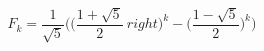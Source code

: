 \documentclass[preview]{standalone}
\begin{document}
\begin{center}
$$F_k = \frac{1}{\sqrt{5}} \big( \big(\frac{1 + \sqrt{5}}{2} \  right)^k - \big(\frac{1 - \sqrt{5}}{2})^k \big)$$
\end{center}
\end{document}
